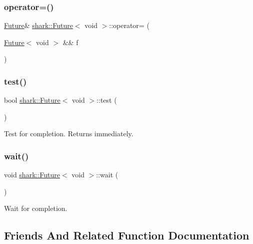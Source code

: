 \subsubsection{\texorpdfstring{operator=()}{operator=()}\hspace{0.1cm}{\footnotesize\ttfamily [2/2]}}
{\footnotesize\ttfamily \hyperlink{structshark_1_1_future}{Future}\& \hyperlink{structshark_1_1_future}{shark\+::\+Future}$<$ void $>$\+::operator= (\begin{DoxyParamCaption}\item[{\hyperlink{structshark_1_1_future}{Future}$<$ void $>$ \&\&}]{f }\end{DoxyParamCaption})}

\hypertarget{structshark_1_1_future_3_01void_01_4_aaed8863f8051fdc001bdf2ffb83d6ccf}{}\label{structshark_1_1_future_3_01void_01_4_aaed8863f8051fdc001bdf2ffb83d6ccf} 
\subsubsection{\texorpdfstring{test()}{test()}}
{\footnotesize\ttfamily bool \hyperlink{structshark_1_1_future}{shark\+::\+Future}$<$ void $>$\+::test (\begin{DoxyParamCaption}{ }\end{DoxyParamCaption})}

Test for completion. Returns immediately. \hypertarget{structshark_1_1_future_3_01void_01_4_ab44321f72b9e3c40b622d612a772156c}{}\label{structshark_1_1_future_3_01void_01_4_ab44321f72b9e3c40b622d612a772156c} 
\subsubsection{\texorpdfstring{wait()}{wait()}}
{\footnotesize\ttfamily void \hyperlink{structshark_1_1_future}{shark\+::\+Future}$<$ void $>$\+::wait (\begin{DoxyParamCaption}{ }\end{DoxyParamCaption})}

Wait for completion. 

\subsection{Friends And Related Function Documentation}
\hypertarget{structshark_1_1_future_3_01void_01_4_a8a5e7aad8bd5339747078692740c0a59}{}\label{structshark_1_1_future_3_01void_01_4_a8a5e7aad8bd5339747078692740c0a59} 
